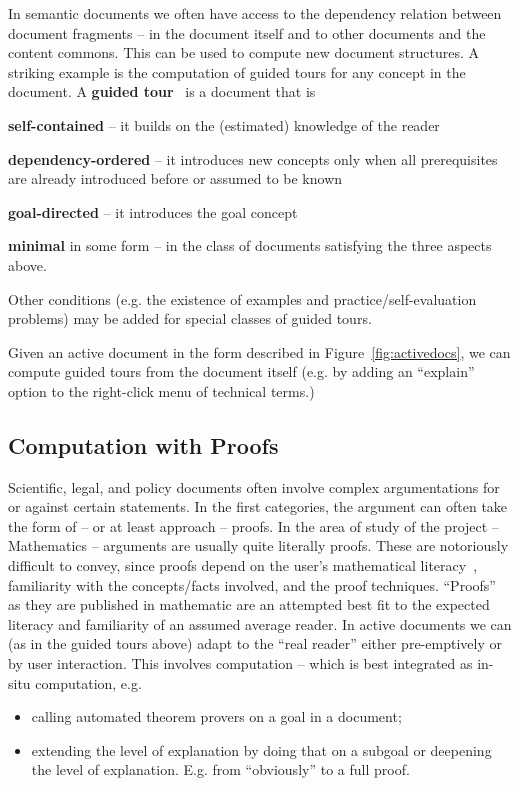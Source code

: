 In semantic documents we often have access to the dependency relation between document
fragments -- in the document itself and to other documents and the content commons. This
can be used to compute new document structures. A striking example is the computation of
guided tours for any concept in the document. A \textbf{guided
  tour}~\cite{KohDavGin:psewads11} is a document that is 
\begin{compactitem}
\item \textbf{self-contained} -- it builds on the (estimated) knowledge of the reader 
\item \textbf{dependency-ordered} -- it introduces new concepts only when all prerequisites are
  already introduced before or assumed to be known
\item \textbf{goal-directed} -- it introduces the goal concept
\item \textbf{minimal} in some form -- in the class of documents satisfying the three
  aspects above.
\end{compactitem}
Other conditions (e.g. the existence of examples and practice/self-evaluation problems)
may be added for special classes of guided tours.

Given an active document in the form described in Figure~\ref{fig:activedocs}, we can
compute guided tours from the document itself (e.g. by adding an ``explain'' option to the
right-click menu of technical terms.)

\subsection{Computation with Proofs}\label{sec:ex:proofs}

Scientific, legal, and policy documents often involve complex argumentations for or
against certain statements. In the first categories, the argument can often take the form
of -- or at least approach -- proofs. In the area of study of the \pn project --
Mathematics -- arguments are usually quite literally proofs. These are notoriously
difficult to convey, since proofs depend on the user's mathematical
literacy~\cite{IanKoh:mlkmim15}, familiarity with the concepts/facts involved, and the
proof techniques. ``Proofs'' as they are published in mathematic are an attempted best fit
to the expected literacy and familiarity of an assumed average reader. In active documents
we can (as in the guided tours above) adapt to the ``real reader'' either pre-emptively or
by user interaction. This involves computation -- which is best integrated as in-situ
computation, e.g.
\begin{itemize}
  \item calling automated theorem provers on a goal in a document;
  \item extending the level of explanation by doing that on a subgoal or deepening the
    level of explanation. E.g. from ``obviously'' to a full proof.
  \end{itemize}






